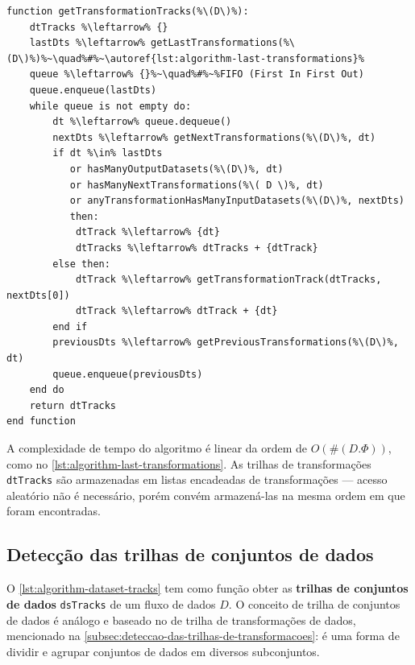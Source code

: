 \begin{minipage}[c]{0.95\textwidth}
\begin{lstlisting}[language=pseudocode,label={lst:algorithm-transformation-tracks},caption={[Detecção das trilhas de transformações]Detecção do rastro do fluxo de dados no nível de trilhas de transformações.}]
function getTransformationTracks(%\(D\)%):
    dtTracks %\leftarrow% {}
    lastDts %\leftarrow% getLastTransformations(%\(D\)%)%~\quad%#%~\autoref{lst:algorithm-last-transformations}%
    queue %\leftarrow% {}%~\quad%#%~%FIFO (First In First Out)
    queue.enqueue(lastDts)
    while queue is not empty do:
        dt %\leftarrow% queue.dequeue()
        nextDts %\leftarrow% getNextTransformations(%\(D\)%, dt)
        if dt %\in% lastDts
           or hasManyOutputDatasets(%\(D\)%, dt)
           or hasManyNextTransformations(%\( D \)%, dt)
           or anyTransformationHasManyInputDatasets(%\(D\)%, nextDts)
           then:
            dtTrack %\leftarrow% {dt}
            dtTracks %\leftarrow% dtTracks + {dtTrack}
        else then:
            dtTrack %\leftarrow% getTransformationTrack(dtTracks, nextDts[0])
            dtTrack %\leftarrow% dtTrack + {dt}
        end if
        previousDts %\leftarrow% getPreviousTransformations(%\(D\)%, dt)
        queue.enqueue(previousDts)
    end do
    return dtTracks
end function
\end{lstlisting}
\end{minipage}

A complexidade de tempo do algoritmo é linear da ordem de \( O(\#(D.\Phi)) \), como no \autoref{lst:algorithm-last-transformations}. As trilhas de transformações \texttt{dtTracks} são armazenadas em listas encadeadas de transformações --- acesso aleatório não é necessário, porém convém armazená-las na mesma ordem em que foram encontradas.

\subsection{Detecção das trilhas de conjuntos de dados}

O \autoref{lst:algorithm-dataset-tracks} tem como função obter as \textbf{trilhas de conjuntos de dados} \texttt{dsTracks} de um fluxo de dados \( D \). O conceito de trilha de conjuntos de dados é análogo e baseado no de trilha de transformações de dados, mencionado na \autoref{subsec:deteccao-das-trilhas-de-transformacoes}: é uma forma de dividir e agrupar conjuntos de dados em diversos subconjuntos.

